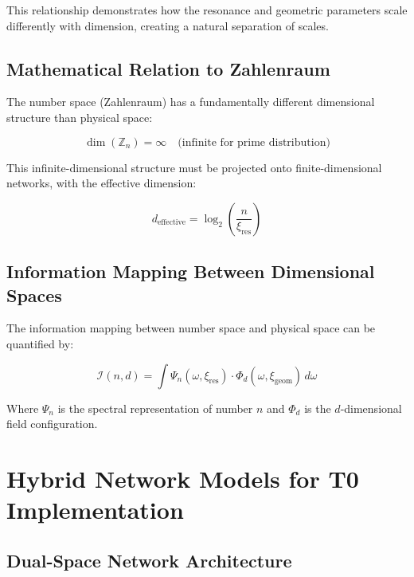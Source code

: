 \documentclass[12pt,a4paper]{article}
\newcommand{\xipar}{\ensuremath{\xi}}
\begin{document}
	This relationship demonstrates how the resonance and geometric parameters scale differently with dimension, creating a natural separation of scales.
	
	\subsection{Mathematical Relation to Zahlenraum}
	\label{subsec:zahlenraum_relation}
	
	The number space (Zahlenraum) has a fundamentally different dimensional structure than physical space:
	
	\begin{equation}
		\dim(\mathbb{Z}_n) = \infty \quad \text{(infinite for prime distribution)}
	\end{equation}
	
	This infinite-dimensional structure must be projected onto finite-dimensional networks, with the effective dimension:
	
	\begin{equation}
		d_{\text{effective}} = \log_2\left(\frac{n}{\xipar_{\text{res}}}\right)
	\end{equation}
	
	\subsection{Information Mapping Between Dimensional Spaces}
	\label{subsec:information_mapping}
	
	The information mapping between number space and physical space can be quantified by:
	
	\begin{equation}
		\mathcal{I}(n, d) = \int \Psi_n(\omega, \xipar_{\text{res}}) \cdot \Phi_d(\omega, \xipar_{\text{geom}}) \, d\omega
	\end{equation}
	
	Where $\Psi_n$ is the spectral representation of number $n$ and $\Phi_d$ is the $d$-dimensional field configuration.
	
	\section{Hybrid Network Models for T0 Implementation}
	\label{sec:hybrid_models}
	
	\subsection{Dual-Space Network Architecture}
	\label{subsec:dual_space}
	
\end{document}
